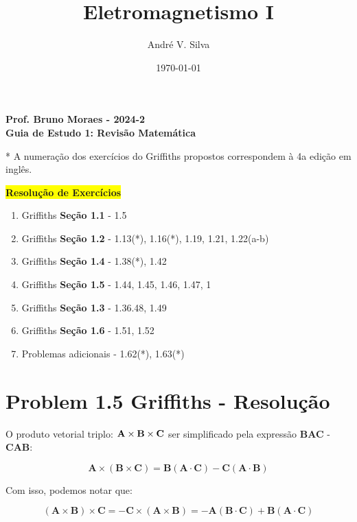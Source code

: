 \documentclass[a4paper,12pt]{article}
\title{ \textbf{\large Eletromagnetismo I }}
\author{Andr\'e V. Silva}
\date{\today}
\begin{document}
\maketitle

\begin{center}
    \textbf{Prof. Bruno Moraes - 2024-2}\\
    \textbf{Guia de Estudo 1: Revisão Matemática}
    \end{center}
    
    * A numeração dos exercícios do Griffiths propostos correspondem à 4a edição em inglês.\\
    
    \begin{center}
    \colorbox{yellow}{\textbf{Resolu\c{c}\~ao de Exerc\'icios}}
    \end{center}
    
    \begin{enumerate}
    \item Griffiths \textbf{Seção 1.1} - 1.5
    \item Griffiths \textbf{Seção 1.2} - 1.13(*), 1.16(*), 1.19, 1.21, 1.22(a-b)
    \item Griffiths \textbf{Seção 1.4} - 1.38(*), 1.42
    \item Griffiths \textbf{Seção 1.5} - 1.44, 1.45, 1.46, 1.47, 1
    \item Griffiths \textbf{Seção 1.3} - 1.36.48, 1.49
    \item Griffiths \textbf{Seção 1.6} - 1.51, 1.52
    \item Problemas adicionais - 1.62(*), 1.63(*)
    \end{enumerate}

\section*{Problem 1.5 Griffiths - Resolu\c{c}\~ao}

O produto vetorial triplo: $\textrm{\textbf{A}}\times\textrm{\textbf{B}}\times\textrm{\textbf{C}}$
ser simplificado pela express\~ao \textbf{BAC} - \textbf{CAB}:

\begin{equation}
    \textbf{A}\times(\textbf{B}\times\textbf{C}) =  \textbf{B}(\textbf{A}\cdot\textbf{C}) - \textbf{C}(\textbf{A}\cdot\textbf{B})
\end{equation}

Com isso, podemos notar que:

\begin{equation}
    (\textbf{A}\times\textbf{B})\times\textbf{C} = -\textbf{C}\times(\textbf{A}\times\textbf{B}) = -\textbf{A}(\textbf{B}\cdot\textbf{C}) + \textbf{B}(\textbf{A}\cdot\textbf{C})
\end{equation}
\end{document}

